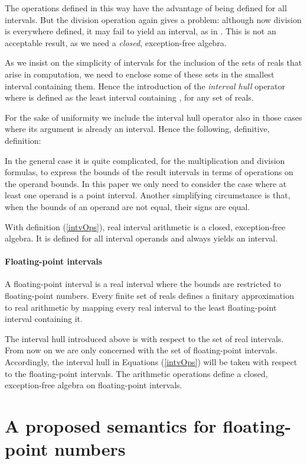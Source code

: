 \documentclass[11pt]{article}
\begin{document}
The operations defined in this way have the advantage of being defined
for all intervals.
But the division operation again gives a problem:
although now division is everywhere defined,
it may fail to yield an interval, as in
.
This is not an acceptable result, as we need a \emph{closed},
exception-free algebra.

As we insist on the simplicity of intervals for the inclusion of the
sets of reals that arise in computation,
we need to enclose some of these sets in the smallest
interval containing them.
Hence the introduction of the \emph{interval hull} operator 
where  is defined as the least interval containing , for any
set  of reals.

For the sake of uniformity we include the interval hull operator also
in those cases where its argument is already an interval. Hence the
following, definitive, definition:

In the general case it is quite complicated, for the multiplication
and division formulas, to express the bounds of the result intervals
in terms of operations on the operand bounds. In this paper we only
need to consider the case where at least one operand is a point
interval. Another simplifying circumstance is that, when the bounds of
an operand are not equal, their signs are equal.

With definition (\ref{intvOps}), real interval arithmetic is a closed,
exception-free algebra. It is defined for all interval operands and
always yields an interval.

\paragraph{Floating-point intervals}

A floating-point interval is a real interval where the bounds are
restricted to floating-point numbers. Every finite set  of reals
defines a finitary approximation to real arithmetic by mapping every
real interval to the least floating-point interval containing it.

The interval hull introduced above is with respect to the set of real
intervals. From now on we are only concerned with the set of
floating-point intervals. Accordingly, the interval hull  in
Equations (\ref{intvOps}) will be taken with respect to the
floating-point intervals. The arithmetic operations define a closed,
exception-free algebra on floating-point intervals.

\section{A proposed semantics for floating-point numbers}
\label{semFlpt}
\end{document}
